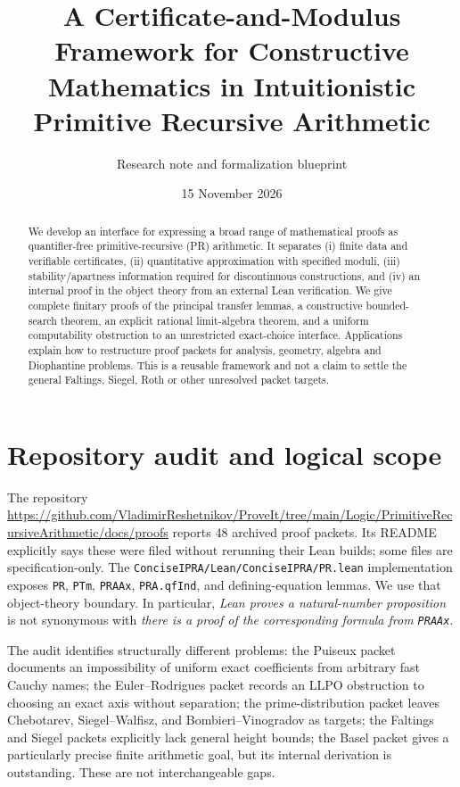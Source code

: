 \documentclass[11pt]{article}
\title{A Certificate-and-Modulus Framework for Constructive Mathematics in Intuitionistic Primitive Recursive Arithmetic}
\author{Research note and formalization blueprint}\date{15 November 2026}
\begin{document}
\maketitle
\begin{abstract}
We develop an interface for expressing a broad range of mathematical proofs as quantifier-free primitive-recursive (PR) arithmetic.  It separates (i) finite data and verifiable certificates, (ii) quantitative approximation with specified moduli, (iii) stability/apartness information required for discontinuous constructions, and (iv) an internal proof in the object theory from an external Lean verification.  We give complete finitary proofs of the principal transfer lemmas, a constructive bounded-search theorem, an explicit rational limit-algebra theorem, and a uniform computability obstruction to an unrestricted exact-choice interface.  Applications explain how to restructure proof packets for analysis, geometry, algebra and Diophantine problems.  This is a reusable framework and not a claim to settle the general Faltings, Siegel, Roth or other unresolved packet targets.
\end{abstract}
\tableofcontents
\section{Repository audit and logical scope}
The repository \url{https://github.com/VladimirReshetnikov/ProveIt/tree/main/Logic/PrimitiveRecursiveArithmetic/docs/proofs} reports 48 archived proof packets.  Its README explicitly says these were filed without rerunning their Lean builds; some files are specification-only.  The \texttt{ConciseIPRA/Lean/ConciseIPRA/PR.lean} implementation exposes \texttt{PR}, \texttt{PTm}, \texttt{PRAAx}, \texttt{PRA.qfInd}, and defining-equation lemmas.  We use that object-theory boundary.  In particular, \emph{Lean proves a natural-number proposition} is not synonymous with \emph{there is a proof of the corresponding formula from \texttt{PRAAx}}.

The audit identifies structurally different problems: the Puiseux packet documents an impossibility of uniform exact coefficients from arbitrary fast Cauchy names; the Euler--Rodrigues packet records an LLPO obstruction to choosing an exact axis without separation; the prime-distribution packet leaves Chebotarev, Siegel--Walfisz, and Bombieri--Vinogradov as targets; the Faltings and Siegel packets explicitly lack general height bounds; the Basel packet gives a particularly precise finite arithmetic goal, but its internal derivation is outstanding.  These are not interchangeable gaps.
\end{document}
